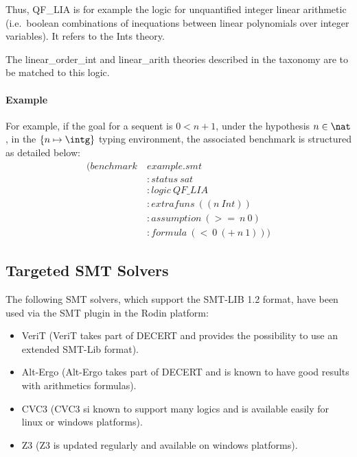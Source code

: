 Thus, QF\_LIA is for example the logic for unquantified integer linear arithmetic (i.e.\ boolean combinations of inequations between linear polynomials over integer variables). It refers to the Ints theory.

The linear\_order\_int and linear\_arith theories described in the taxonomy\cite{TAXO09} are to be matched to this logic. 

\paragraph{Example}
For example, if the goal for a sequent is $0 < n + 1$, under the hypothesis $n \in \nat$, in the $\{n \mapsto \intg\}$ typing environment, the associated benchmark is structured as detailed below:
\begin{align*}
(benchmark~&example.smt                      \\
           &:status~sat                      \\
           &:logic~QF\_LIA                   \\
           &:extrafuns~((n~Int))             \\
           &:assumption~(>=~n~0)             \\
           &:formula~(<~0~(+~n~1))) 
\end{align*}

\subsection{Targeted SMT Solvers}
The following SMT solvers, which support the SMT-LIB 1.2 format, have been used via the SMT plugin in the Rodin platform: 
\begin{itemize}
\item VeriT\cite{VERIT} (VeriT takes part of DECERT and provides the possibility to use an extended SMT-Lib format).
\item Alt-Ergo\cite{ALTERGO} (Alt-Ergo takes part of DECERT and is known to have good results with arithmetics formulas).
\item CVC3\cite{CVC3} (CVC3 si known to support many logics and is available easily for linux or windows platforms).
\item Z3\cite{Z3} (Z3 is updated regularly and available on windows platforms).
\end{itemize}

